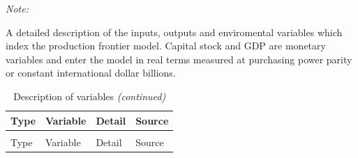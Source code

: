 \documentclass[
  10pt,
]{article}
\begin{document}
\begin{ThreePartTable}
\begin{TableNotes}
\item \textit{Note: } 
\item A detailed description of the inputs, outputs and enviromental variables which index the production frontier model.  Capital stock and GDP are monetary variables and enter the model in real terms measured at purchasing power parity or constant international dollar billions.
\end{TableNotes}
\begin{longtabu} to 
\caption{\label{tab:table 1 descriptions}Description of variables}\\
\toprule
Type & Variable & Detail & Source\\
\midrule
\endfirsthead
\caption[]{Description of variables \textit{(continued)}}\\
\toprule
Type & Variable & Detail & Source\\
\midrule
\endhead


\end{longtabu}
\end{ThreePartTable}
\end{document}
